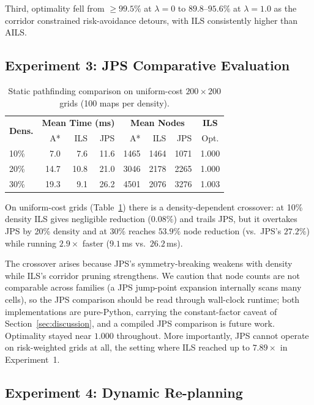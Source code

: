 \documentclass[preprint,12pt,authoryear]{elsarticle}
\begin{document}
Third, optimality fell from $\geq 99.5\%$ at $\lambda = 0$ to $89.8$--$95.6\%$ at $\lambda = 1.0$ as the corridor constrained risk-avoidance detours, with ILS consistently higher than AILS.

\subsection{Experiment 3: JPS Comparative Evaluation}

\begin{table}[!htbp]
\centering
\caption{Static pathfinding comparison on uniform-cost $200 \times 200$ grids (100 maps per density).}
\label{tab:exp3_jps}
\begin{tabular}{lrrrrrrc}
\toprule
\multirow{2}{*}{\textbf{Dens.}} & \multicolumn{3}{c}{\textbf{Mean Time (ms)}} & \multicolumn{3}{c}{\textbf{Mean Nodes}} & \textbf{ILS} \\
& A* & ILS & JPS & A* & ILS & JPS & Opt. \\
\midrule
10\% & 7.0 & 7.6 & 11.6 & 1465 & 1464 & 1071 & 1.000 \\
20\% & 14.7 & 10.8 & 21.0 & 3046 & 2178 & 2265 & 1.000 \\
30\% & 19.3 & 9.1 & 26.2 & 4501 & 2076 & 3276 & 1.003 \\
\bottomrule
\end{tabular}
\end{table}

On uniform-cost grids (Table~\ref{tab:exp3_jps}) there is a density-dependent crossover: at 10\% density ILS gives negligible reduction ($0.08\%$) and trails JPS, but it overtakes JPS by 20\% density and at 30\% reaches $53.9\%$ node reduction (vs.\ JPS's $27.2\%$) while running $2.9\times$ faster ($9.1$\,ms vs.\ $26.2$\,ms).

The crossover arises because JPS's symmetry-breaking weakens with density while ILS's corridor pruning strengthens. We caution that node counts are not comparable across families (a JPS jump-point expansion internally scans many cells), so the JPS comparison should be read through wall-clock runtime; both implementations are pure-Python, carrying the constant-factor caveat of Section~\ref{sec:discussion}, and a compiled JPS comparison is future work. Optimality stayed near $1.000$ throughout. More importantly, JPS cannot operate on risk-weighted grids at all, the setting where ILS reached up to $7.89\times$ in Experiment~1.

\subsection{Experiment 4: Dynamic Re-planning}
\end{document}
